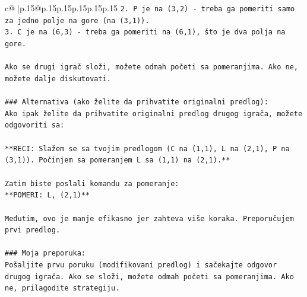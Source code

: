 \documentclass{article}
\begin{document}
{\begin{supertabular}{c@{$\;$}|p{.15\linewidth}@{}p{.15\linewidth}p{.15\linewidth}p{.15\linewidth}p{.15\linewidth}p{.15\linewidth}}
{{{\texttt{2. P je na (3,2) {-} treba ga pomeriti samo za jedno polje na gore (na (3,1)).} \\
\texttt{3. C je na (6,3) {-} treba ga pomeriti na (6,1), što je dva polja na gore.} \\
\\ 
\texttt{Ako se drugi igrač složi, možete odmah početi sa pomeranjima. Ako ne, možete dalje diskutovati.} \\
\\ 
\texttt{\#\#\# Alternativa (ako želite da prihvatite originalni predlog):} \\
\texttt{Ako ipak želite da prihvatite originalni predlog drugog igrača, možete odgovoriti sa:} \\
\\ 
\texttt{**RECI: Slažem se sa tvojim predlogom (C na (1,1), L na (2,1), P na (3,1)). Počinjem sa pomeranjem L sa (1,1) na (2,1).**} \\
\\ 
\texttt{Zatim biste poslali komandu za pomeranje:} \\
\texttt{**POMERI: L, (2,1)**} \\
\\ 
\texttt{Međutim, ovo je manje efikasno jer zahteva više koraka. Preporučujem prvi predlog.} \\
\\ 
\texttt{\#\#\# Moja preporuka:} \\
\texttt{Pošaljite prvu poruku (modifikovani predlog) i sačekajte odgovor drugog igrača. Ako se složi, možete odmah početi sa pomeranjima. Ako ne, prilagodite strategiju.} \\
            }
        }
    }
     \\ \\


\end{supertabular}}
\end{document}
